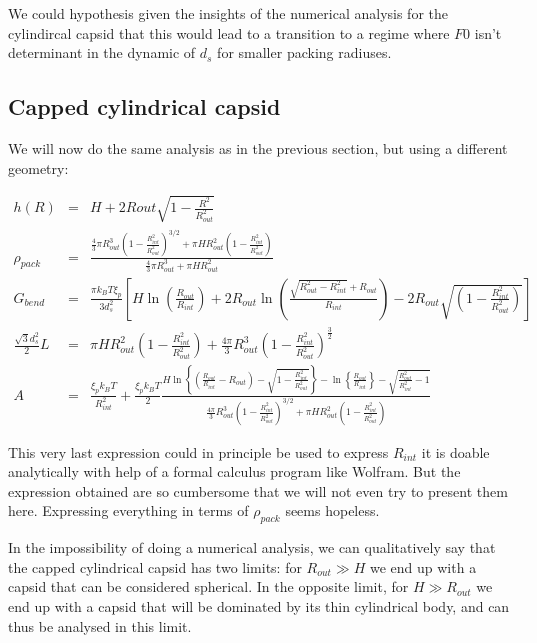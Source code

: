 \documentclass{article}
\begin{document}
We could hypothesis given the insights of the numerical analysis for the cylindircal capsid that this would lead to a transition to a regime where $F0$ isn't determinant in the dynamic of $d_s$ for smaller packing radiuses.

\subsection{Capped cylindrical capsid}

We will now do the same analysis as in the previous section, but using a different geometry:

\begin{eqnarray}
    h(R) &=& H + 2Rout \sqrt{1 - \frac{R^2}{R_{out}^2}} \\
    \rho_{pack} &=& \frac{ \frac{4}{3}\pi R_{out}^3 \left( 1 - \frac{R_{int}^2}{R_{out}^2} \right)^{3/2} + \pi H R_{out}^2 \left( 1 - \frac{R_{int}^2}{R_{out}^2} \right) }{ \frac{4}{3} \pi R_{out}^3 + \pi H R_{out}^2 } \\
    G_{bend} & = & \frac{\pi k_B T \xi_p}{3 d_s^2} \left[ H \ln \left( \frac{R_{out}}{R_{int}} \right)  + 2R_{out} \ln \left( \frac{\sqrt{R_{out}^2 - R_{int}^2} + R_{out}}{R_{int}} \right) - 2 R_{out} \sqrt{\left( 1 - \frac{R_{int}^2}{R_{out}^2} \right)} \right] \\
    \frac{\sqrt{3}d_s^2}{2} L & = & \pi H R_{out}^2 \left( 1 - \frac{R_{int}^2}{R_{out}^2} \right) + \frac{4\pi}{3} R_{out}^3 \left( 1 - \frac{R_{int}^2}{R_{out}^2} \right)^\frac{3}{2} \\
    A &=& \frac{\xi_p k_B T}{R_{int}^2} + \frac{\xi_p k_B T}{2} \frac{ H \ln \left\{ \left( \frac{R_{out}}{R_{int}} - R_{out}\right) - \sqrt{ 1 - \frac{R_{int}^2}{R_{out}^2}} \right\} - \ln \left\{ \frac{R_{out}}{R_{int}} \right\} - \sqrt{\frac{R_{out}^2}{R_{int}^2}-1}}{\frac{4\pi}{3} R_{out}^3 \left( 1 - \frac{R_{int}^2}{R_{out}^2}\right)^{3/2} + \pi H R_{out}^2 \left( 1 - \frac{R_{int}^2}{R_{out}^2} \right) }
\end{eqnarray}

This very last expression could in principle be used to express $R_{int}$ it is doable analytically with help of a formal calculus program like Wolfram. But the expression obtained are so cumbersome that we will not even try to present them here. Expressing everything in terms of $\rho_{pack}$ seems hopeless.

In the impossibility of doing a numerical analysis, we can qualitatively say that the capped cylindrical capsid has two limits: for $R_{out} \gg H$ we end up with a capsid that can be considered spherical. In the opposite limit, for $H \gg R_{out}$ we end up with a capsid that will be dominated by its thin cylindrical body, and can thus be analysed in this limit.
\end{document}
